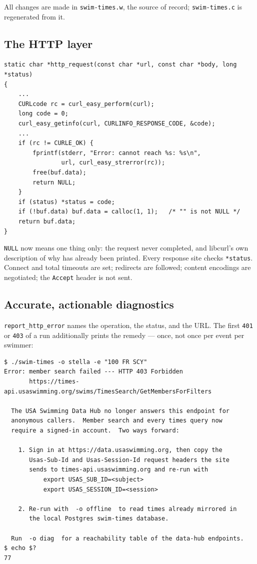 \documentclass[11pt]{article}
\newcommand{\code}[1]{\texttt{#1}}
\begin{document}
All changes are made in \code{swim-times.w}, the source of record;
\code{swim-times.c} is regenerated from it.

\subsection{The HTTP layer}

\begin{lstlisting}
static char *http_request(const char *url, const char *body, long *status)
{
    ...
    CURLcode rc = curl_easy_perform(curl);
    long code = 0;
    curl_easy_getinfo(curl, CURLINFO_RESPONSE_CODE, &code);
    ...
    if (rc != CURLE_OK) {
        fprintf(stderr, "Error: cannot reach %s: %s\n",
                url, curl_easy_strerror(rc));
        free(buf.data);
        return NULL;
    }
    if (status) *status = code;
    if (!buf.data) buf.data = calloc(1, 1);   /* "" is not NULL */
    return buf.data;
}
\end{lstlisting}

\noindent \code{NULL} now means one thing only: the request never
completed, and libcurl's own description of why has already been
printed.  Every response site checks \code{*status}.  Connect and total
timeouts are set; redirects are followed; content encodings are
negotiated; the \code{Accept} header is not sent.

\subsection{Accurate, actionable diagnostics}

\code{report\_http\_error} names the operation, the status, and the URL.
The first \code{401} or \code{403} of a run additionally prints the
remedy --- once, not once per event per swimmer:

\begin{lstlisting}
$ ./swim-times -o stella -e "100 FR SCY"
Error: member search failed --- HTTP 403 Forbidden
       https://times-api.usaswimming.org/swims/TimesSearch/GetMembersForFilters

  The USA Swimming Data Hub no longer answers this endpoint for
  anonymous callers.  Member search and every times query now
  require a signed-in account.  Two ways forward:

    1. Sign in at https://data.usaswimming.org, then copy the
       Usas-Sub-Id and Usas-Session-Id request headers the site
       sends to times-api.usaswimming.org and re-run with
           export USAS_SUB_ID=<subject>
           export USAS_SESSION_ID=<session>

    2. Re-run with  -o offline  to read times already mirrored in
       the local Postgres swim-times database.

  Run  -o diag  for a reachability table of the data-hub endpoints.
$ echo $?
77
\end{lstlisting}
\end{document}
